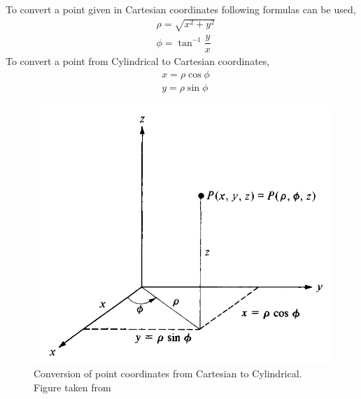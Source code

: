 \documentclass[12pt,a4paper]{article}
\begin{document}
To convert a point given in Cartesian coordinates following formulas can be used,
\begin{equation}
\begin{split}
&\rho = \sqrt{x^2+y^2}\\
&\phi = \tan^{-1}{\dfrac{y}{x}}
\end{split}
\end{equation}
To convert a point from Cylindrical to Cartesian coordinates,
\begin{equation}
\begin{split}
&x = \rho\cos\phi\\
&y = \rho\sin\phi
\end{split}
\end{equation}
\begin{figure}[H]
\centering
\includegraphics[scale=0.45]{Figure2-2S.png}
\caption{Conversion of point coordinates from Cartesian to Cylindrical. Figure taken from~\cite[Figure 2.2, page 31]{Sadiku}}
\label{Cartesian-to-Cylindrical}
\end{figure}
\end{document}
